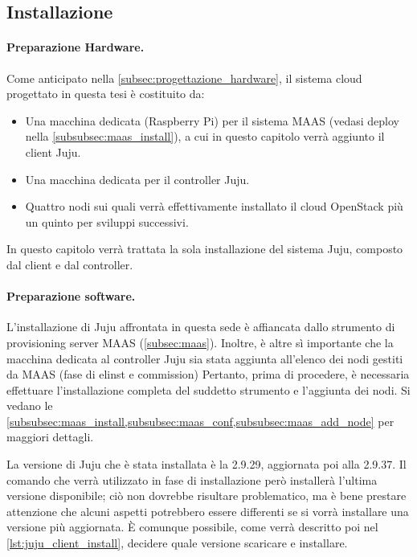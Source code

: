 \subsection{Installazione}\label{subsubsec:juju_install}
\paragraph{Preparazione Hardware.}
Come anticipato nella \cref{subsec:progettazione_hardware}, il  sistema cloud  progettato in questa tesi è costituito da:
\begin{itemize}
    \item Una macchina dedicata (Raspberry Pi) per il sistema MAAS (vedasi deploy nella \cref{subsubsec:maas_install}), a cui in questo capitolo verrà aggiunto il client Juju.

    \item Una macchina dedicata per il controller Juju.
    
    \item Quattro nodi sui quali verrà effettivamente installato il cloud OpenStack più un quinto per sviluppi successivi.
\end{itemize}
% 
In questo capitolo verrà trattata la sola installazione del sistema Juju, composto dal client e dal controller.

\paragraph{Preparazione software.}
L'installazione di Juju affrontata in questa sede è affiancata dallo strumento di provisioning server MAAS (\cref{subsec:maas}).
% 
Inoltre, è altre sì importante che la macchina dedicata al controller Juju sia stata aggiunta all'elenco dei nodi gestiti da MAAS (fase di elinst e commission)
% 
Pertanto, prima di procedere, è necessaria effettuare l'installazione completa del suddetto strumento e l'aggiunta dei nodi.
% 
Si vedano le \cref{subsubsec:maas_install,subsubsec:maas_conf,subsubsec:maas_add_node} per maggiori dettagli.

\bigskip
La versione di Juju che è stata installata è la 2.9.29, aggiornata poi alla 2.9.37.
% 
Il comando che verrà utilizzato in fase di installazione però installerà l'ultima versione disponibile;
% 
ciò non dovrebbe risultare problematico, ma è bene prestare attenzione che alcuni aspetti potrebbero essere differenti se si vorrà installare una versione più aggiornata.
% 
È comunque possibile, come verrà descritto poi nel \cref{lst:juju_client_install}, decidere quale versione scaricare e installare.


